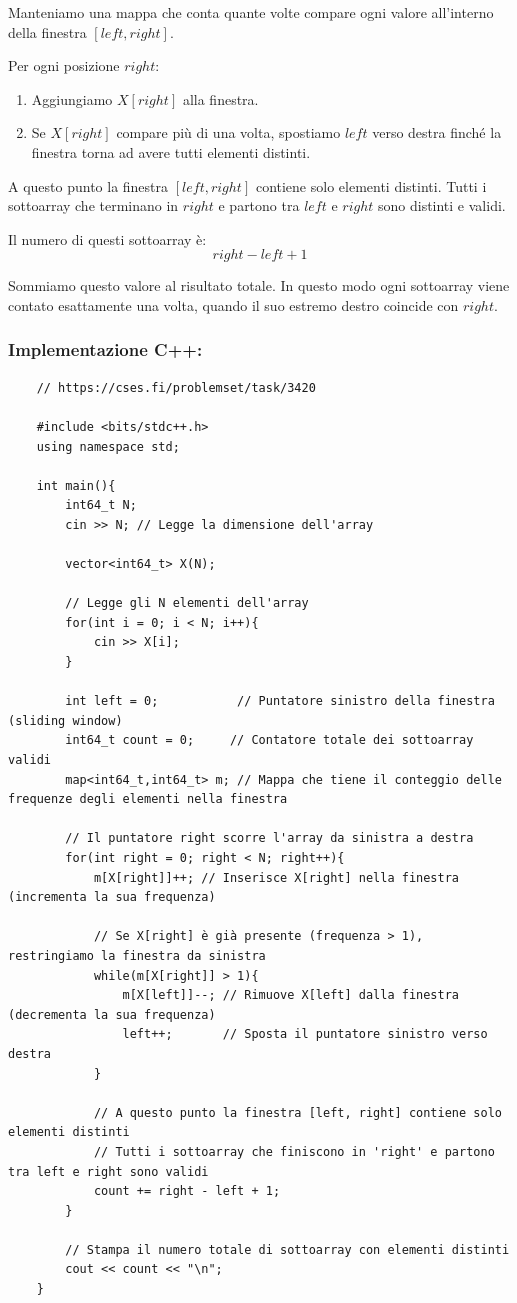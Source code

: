Manteniamo una mappa che conta quante volte compare ogni valore all'interno della finestra $[left, right]$.

Per ogni posizione $right$:
\begin{enumerate}
	\item Aggiungiamo $X[right]$ alla finestra.
	\item Se $X[right]$ compare più di una volta, spostiamo $left$ verso destra finché la finestra torna ad avere tutti elementi distinti.
\end{enumerate}

A questo punto la finestra $[left, right]$ contiene solo elementi distinti.  
Tutti i sottoarray che terminano in $right$ e partono tra $left$ e $right$ sono distinti e validi.  

Il numero di questi sottoarray è:
\[
right - left + 1
\]

Sommiamo questo valore al risultato totale.  
In questo modo ogni sottoarray viene contato esattamente una volta, quando il suo estremo destro coincide con $right$.



\subsubsection*{Implementazione C++:}
\begin{lstlisting}
	// https://cses.fi/problemset/task/3420
	
	#include <bits/stdc++.h>
	using namespace std;
	
	int main(){
		int64_t N;
		cin >> N; // Legge la dimensione dell'array
		
		vector<int64_t> X(N);
		
		// Legge gli N elementi dell'array
		for(int i = 0; i < N; i++){
			cin >> X[i];
		}
		
		int left = 0;           // Puntatore sinistro della finestra (sliding window)
		int64_t count = 0;     // Contatore totale dei sottoarray validi
		map<int64_t,int64_t> m; // Mappa che tiene il conteggio delle frequenze degli elementi nella finestra
		
		// Il puntatore right scorre l'array da sinistra a destra
		for(int right = 0; right < N; right++){
			m[X[right]]++; // Inserisce X[right] nella finestra (incrementa la sua frequenza)
			
			// Se X[right] è già presente (frequenza > 1), restringiamo la finestra da sinistra
			while(m[X[right]] > 1){
				m[X[left]]--; // Rimuove X[left] dalla finestra (decrementa la sua frequenza)
				left++;       // Sposta il puntatore sinistro verso destra
			}
			
			// A questo punto la finestra [left, right] contiene solo elementi distinti
			// Tutti i sottoarray che finiscono in 'right' e partono tra left e right sono validi
			count += right - left + 1;
		}
		
		// Stampa il numero totale di sottoarray con elementi distinti
		cout << count << "\n";
	}
	
	
\end{lstlisting}

